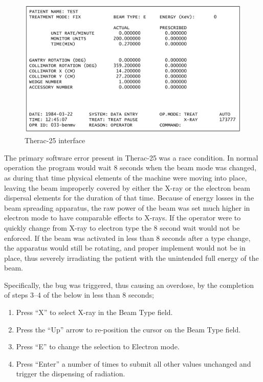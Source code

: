 \documentclass{cshonours}
\newcommand{\ther}{Therac-25\xspace}
\begin{document}
\begin{figure}
 \centering
 \includegraphics[width=\textwidth]{figs/interface.pdf}
 \caption{\ther interface}
 \label{fig:theracui}
\end{figure}

The primary software error present in \ther was a race condition. In normal operation the program would wait 8 seconds when the beam mode was changed, as during that time physical elements of the machine were moving into place, leaving the beam improperly covered by either the X-ray or the electron beam dispersal elements for the duration of that time. Because of energy losses in the beam spreading apparatus, the raw power of the beam was set much higher in electron mode to have comparable effects to X-rays.  If the operator were to quickly change from X-ray to electron type the 8 second wait would not be enforced. If the beam was activated in less than 8 seconds after a type change, the apparatus would still be rotating, and proper implement would not be in place, thus severely irradiating the patient with the unintended full energy of the beam.

Specifically, the bug was triggered, thus causing an overdose, by the completion of steps 3--4 of the below in less than 8 seconds;
\begin{enumerate}
 \item Press ``X'' to select X-ray in the Beam Type field.
 \item Press the ``Up'' arrow to re-position the cursor on the Beam Type field.
 \item Press ``E'' to change the selection to Electron mode.
 \item Press ``Enter'' a number of times to submit all other values unchanged and trigger the dispensing of radiation.
\end{enumerate}
\end{document}
